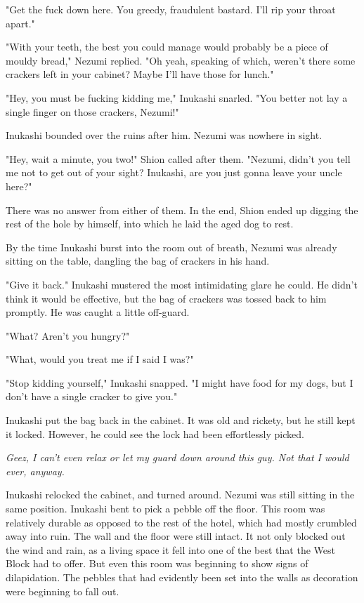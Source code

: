 "Get the fuck down here. You greedy, fraudulent bastard. I'll rip your
throat apart."

"With your teeth, the best you could manage would probably be a piece of
mouldy bread," Nezumi replied. "Oh yeah, speaking of which, weren't
there some crackers left in your cabinet? Maybe I'll have those for
lunch."

"Hey, you must be fucking kidding me," Inukashi snarled. "You better not
lay a single finger on those crackers, Nezumi!"

Inukashi bounded over the ruins after him. Nezumi was nowhere in sight.

"Hey, wait a minute, you two!" Shion called after them. "Nezumi, didn't
you tell me not to get out of your sight? Inukashi, are you just gonna
leave your uncle here?"

There was no answer from either of them. In the end, Shion ended up
digging the rest of the hole by himself, into which he laid the aged dog
to rest.

\mybreak

By the time Inukashi burst into the room out of breath, Nezumi was
already sitting on the table, dangling the bag of crackers in his hand.

"Give it back." Inukashi mustered the most intimidating glare he could.
He didn't think it would be effective, but the bag of crackers was
tossed back to him promptly. He was caught a little off-guard.

"What? Aren't you hungry?"

"What, would you treat me if I said I was?"

"Stop kidding yourself," Inukashi snapped. "I might have food for my
dogs, but I don't have a single cracker to give you."

Inukashi put the bag back in the cabinet. It was old and rickety, but he
still kept it locked. However, he could see the lock had been
effortlessly picked.

\emph{Geez, I can't even relax or let my guard down around this guy. Not that
I would ever, anyway.}

Inukashi relocked the cabinet, and turned around. Nezumi was still
sitting in the same position. Inukashi bent to pick a pebble off the
floor. This room was relatively durable as opposed to the rest of the
hotel, which had mostly crumbled away into ruin. The wall and the floor
were still intact. It not only blocked out the wind and rain, as a
living space it fell into one of the best that the West Block had to
offer. But even this room was beginning to show signs of dilapidation.
The pebbles that had evidently been set into the walls as decoration
were beginning to fall out.

